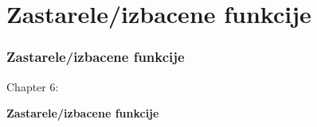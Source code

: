 %

\section{Zastarele/izbacene funkcije}
\begin{frame}[fragile]
	\frametitle{Zastarele/izbacene funkcije}

	\begin{center}\huge{Chapter 6:}\end{center}
	\begin{center}\huge{\color{typo3darkgrey}\textbf{Zastarele/izbacene funkcije}}\end{center}

\end{frame}


